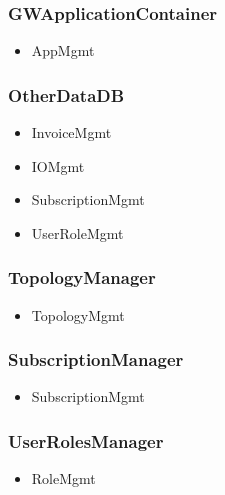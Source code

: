 {{{    \subsubsection{GWApplicationContainer}
        \begin{itemize}
            \item AppMgmt
        \end{itemize}

    \subsubsection{OtherDataDB}
        \begin{itemize}
            \item InvoiceMgmt
            \item IOMgmt
            \item SubscriptionMgmt
            \item UserRoleMgmt
        \end{itemize}

    \subsubsection{TopologyManager}
        \begin{itemize}
            \item TopologyMgmt
        \end{itemize}

    \subsubsection{SubscriptionManager}
        \begin{itemize}
            \item SubscriptionMgmt
        \end{itemize}

    \subsubsection{UserRolesManager}
        \begin{itemize}
            \item RoleMgmt
        \end{itemize}


}}}
